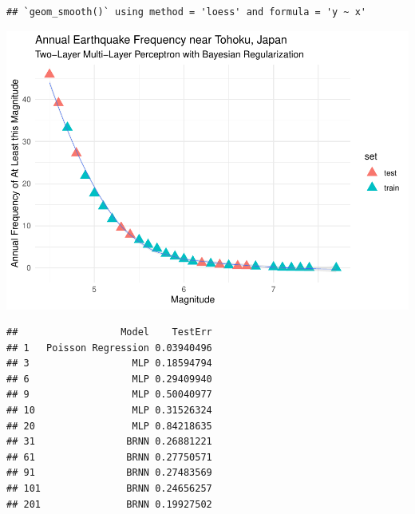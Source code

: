 \begin{verbatim}
## `geom_smooth()` using method = 'loess' and formula = 'y ~ x'
\end{verbatim}

\includegraphics{Appendix_eq_files/figure-latex/unnamed-chunk-11-1.pdf}

\begin{Shaded}
\begin{Highlighting}[]
\end{Highlighting}
\end{Shaded}

\begin{verbatim}
##                  Model    TestErr
## 1   Poisson Regression 0.03940496
## 3                  MLP 0.18594794
## 6                  MLP 0.29409940
## 9                  MLP 0.50040977
## 10                 MLP 0.31526324
## 20                 MLP 0.84218635
## 31                BRNN 0.26881221
## 61                BRNN 0.27750571
## 91                BRNN 0.27483569
## 101               BRNN 0.24656257
## 201               BRNN 0.19927502
\end{verbatim}

